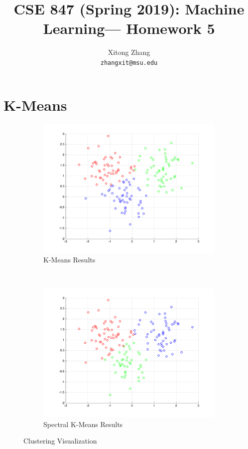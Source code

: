 \documentclass{article}
\title{CSE 847 (Spring 2019): Machine Learning— Homework 5} %
\author{Xitong Zhang\\ \texttt{zhangxit@msu.edu}}
\date{}
\begin{document}
\maketitle %
\section{K-Means} 
\begin{figure}[h!]
    \centering
    \begin{subfigure}{0.45\textwidth}
        \centering
        \includegraphics[width=\textwidth]{../K-means.png}
        \caption{K-Means Results}
    \end{subfigure}%
    ~
    \begin{subfigure}{0.45\textwidth}
        \centering
        \includegraphics[width=\textwidth]{../Spectral-K-means.png}
        \caption{Spectral K-Means Results}
    \end{subfigure}
    \caption{Clustering Visualization}
\end{figure}
\end{document}
